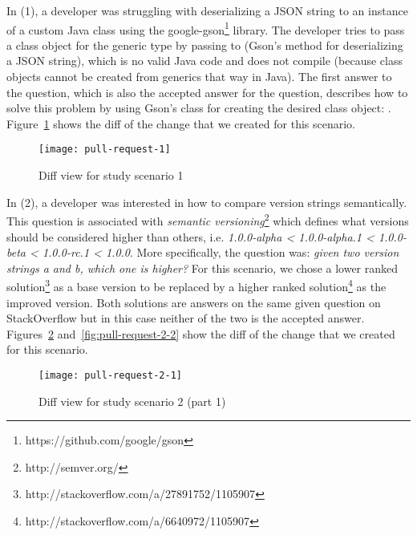 \documentclass[../manifest.tex]{subfiles}
\begin{document}
In (1), a developer was struggling with deserializing a JSON string to an instance of a custom Java class using the google-gson\footnote{https://github.com/google/gson} library. The developer tries to pass a class object for the generic type  by passing  to  (Gson's method for deserializing a JSON string), which is no valid Java code and does not compile (because class objects cannot be created from generics that way in Java). The first answer to the question, which is also the accepted answer for the question, describes how to solve this problem by using Gson's  class for creating the desired class object: . Figure~\ref{fig:pull-request-1} shows the diff of the change that we created for this scenario.

\begin{figure}[h]
  \centering
  \texttt{[image: pull-request-1]}
  \caption{Diff view for study scenario 1}
  \label{fig:pull-request-1}
\end{figure}

In (2), a developer was interested in how to compare version strings semantically. This question is associated with \textit{semantic versioning}\footnote{http://semver.org/} which defines what versions should be considered higher than others, i.e. \textit{1.0.0-alpha < 1.0.0-alpha.1 < 1.0.0-beta < 1.0.0-rc.1 < 1.0.0}. More specifically, the question was: \textit{given two version strings a and b, which one is higher?} For this scenario, we chose a lower ranked solution\footnote{http://stackoverflow.com/a/27891752/1105907} as a base version to be replaced by a higher ranked solution\footnote{http://stackoverflow.com/a/6640972/1105907} as the improved version. Both solutions are answers on the same given question on StackOverflow but in this case neither of the two is the accepted answer. Figures~\ref{fig:pull-request-2-1} and~\ref{fig:pull-request-2-2} show the diff of the change that we created for this scenario.


\begin{figure}[h]
  \centering
  \texttt{[image: pull-request-2-1]}
  \caption{Diff view for study scenario 2 (part 1)}
  \label{fig:pull-request-2-1}
\end{figure}
\end{document}
